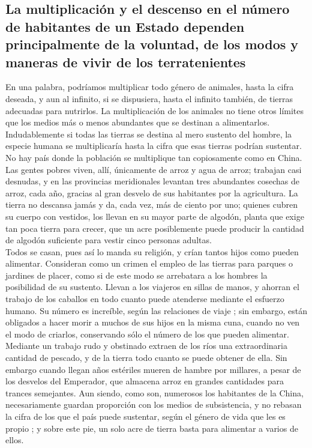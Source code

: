 \documentclass[10pt]{article}
\begin{document}
\begin{multicols}{1}
\section*{La multiplicación y el descenso en el número de habitantes de un Estado dependen principalmente de la voluntad, de los modos y maneras de vivir de los terratenientes}
En una palabra, podríamos multiplicar todo género de animales, hasta la cifra deseada, y aun al infinito, si se dispusiera, hasta el infinito también, de tierras adecuadas para nutrirlos. La multiplicación de los animales no tiene otros límites que los medios más o menos abundantes que se destinan a alimentarlos. Indudablemente si todas las tierras se destina al mero sustento del hombre, la especie humana se multiplicaría hasta la cifra que esas tierras podrían sustentar.\\
No hay país donde la población se multiplique tan copiosamente como en China. Las gentes pobres viven, allí, únicamente de arroz y agua de arroz; trabajan casi desnudas, y en las provincias meridionales levantan tres abundantes cosechas de arroz, cada año, gracias al gran desvelo de sus habitantes por la agricultura. La tierra no descansa jamás y da, cada vez, más de ciento por uno; quienes cubren su cuerpo con vestidos, los llevan en su mayor parte de algodón, planta que exige tan poca tierra para crecer, que un acre posiblemente puede producir la cantidad de algodón suficiente para vestir cinco personas adultas.\\
Todos se casan, pues así lo manda su religión, y crían tantos hijos como pueden alimentar. Consideran como un crimen el empleo de las tierras para parques o jardines de placer, como si de este modo se arrebatara a los hombres la posibilidad de su sustento. Llevan a los viajeros en sillas de manos, y ahorran el trabajo de los caballos en todo cuanto puede atenderse mediante el esfuerzo humano. Su número es increíble, según las relaciones de viaje ; sin embargo, están obligados a hacer morir a muchos de sus hijos en la misma cuna, cuando no ven el modo de criarlos, conservando sólo el número de los que pueden alimentar. Mediante un trabajo rudo y obstinado extraen de los ríos una extraordinaria cantidad de pescado, y de la tierra todo cuanto se puede obtener de ella. Sin embargo cuando llegan años estériles mueren de hambre por millares, a pesar de los desvelos del Emperador, que almacena arroz en grandes cantidades para trances semejantes. Aun siendo, como son, numerosos los habitantes de la China, necesariamente guardan proporción con los medios de subsistencia, y no rebasan la cifra de los que el país puede sustentar, según el género de vida que les es propio ; y sobre este pie, un solo acre de tierra basta para alimentar a varios de ellos.\\

\end{multicols}
\end{document}

